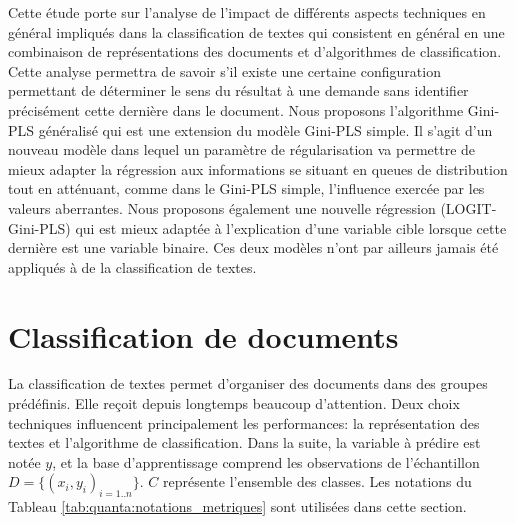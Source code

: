 Cette étude porte sur l'analyse de l'impact de différents aspects techniques en général impliqués dans la classification de textes qui consistent en général en une combinaison de représentations des documents et d'algorithmes de classification. Cette analyse permettra de savoir s'il existe une certaine configuration permettant de déterminer le sens du résultat à une demande sans identifier précisément cette dernière dans le document. Nous proposons l'algorithme Gini-PLS généralisé qui est une extension du modèle Gini-PLS simple. Il s'agit d'un nouveau modèle dans lequel un paramètre de régularisation va permettre de mieux adapter la régression aux informations se situant en queues de distribution tout en atténuant, comme dans le Gini-PLS simple, l'influence exercée par les valeurs aberrantes. Nous proposons également une nouvelle régression (LOGIT-Gini-PLS) qui est mieux adaptée à l'explication d'une variable cible lorsque cette dernière est une variable binaire. Ces deux modèles n'ont par ailleurs jamais été appliqués à de la classification de textes.


\section{Classification de documents}
\label{sec:sensresultat:biblio_classif}

La classification de textes permet d'organiser des documents dans des groupes prédéfinis. Elle reçoit depuis longtemps beaucoup d'attention. Deux choix techniques influencent principalement les performances: la représentation des textes et l'algorithme de classification. Dans la suite, la variable à prédire est notée $y$, et la base d'apprentissage comprend les observations de l'échantillon $D = \lbrace (x_i, y_i)_{i=1..n} \rbrace$. $C$ représente l'ensemble des classes.  Les notations du Tableau \ref{tab:quanta:notations_metriques} sont utilisées dans cette section.

